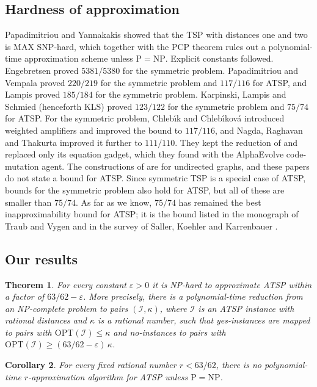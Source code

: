 \documentclass[11pt]{amsart}
\newtheorem{theorem}{Theorem}[section]
\newtheorem{corollary}[theorem]{Corollary}
\theoremstyle{definition}
\theoremstyle{remark}
\numberwithin{equation}{section}
\newcommand{\eps}{\varepsilon}
\begin{document}
\subsection*{Hardness of approximation}
Papadimitriou and Yannakakis \cite{PY93} showed that the TSP with distances one and two is MAX SNP-hard, which together with the PCP theorem \cite{ALMSS98} rules out a polynomial-time approximation scheme unless $\mathrm{P}=\mathrm{NP}$. Explicit constants followed. Engebretsen \cite{Eng03} proved $5381/5380$ for the symmetric problem. Papadimitriou and Vempala \cite{PV06} proved $220/219$ for the symmetric problem and $117/116$ for ATSP, and Lampis \cite{Lam12} proved $185/184$ for the symmetric problem. Karpinski, Lampis and Schmied \cite{KLS15} (henceforth KLS) proved $123/122$ for the symmetric problem and $75/74$ for ATSP. For the symmetric problem, Chleb\'{\i}k and Chleb\'{\i}kov\'a \cite{CC19,CC22} introduced weighted amplifiers and improved the bound to $117/116$, and Nagda, Raghavan and Thakurta \cite{NRT26} improved it further to $111/110$. They kept the reduction of \cite{CC22} and replaced only its equation gadget, which they found with the AlphaEvolve code-mutation agent. The constructions of \cite{CC22,NRT26} are for undirected graphs, and these papers do not state a bound for ATSP. Since symmetric TSP is a special case of ATSP, bounds for the symmetric problem also hold for ATSP, but all of these are smaller than $75/74$. As far as we know, $75/74$ has remained the best inapproximability bound for ATSP; it is the bound listed in the monograph of Traub and Vygen \cite[\S17.1]{TV24} and in the survey of Saller, Koehler and Karrenbauer \cite{SKK25}.

\subsection*{Our results}

\begin{theorem}\label{thm:main}
For every constant $\eps>0$ it is NP-hard to approximate ATSP within a factor of $63/62-\eps$. More precisely, there is a polynomial-time reduction from an NP-complete problem to pairs $(\mathcal{I},\kappa)$, where $\mathcal{I}$ is an ATSP instance with rational distances and $\kappa$ is a rational number, such that yes-instances are mapped to pairs with $\mathrm{OPT}(\mathcal{I})\le\kappa$ and no-instances to pairs with $\mathrm{OPT}(\mathcal{I})\ge(63/62-\eps)\,\kappa$.
\end{theorem}

\begin{corollary}\label{cor:main}
For every fixed rational number $r<63/62$, there is no polynomial-time $r$-approximation algorithm for ATSP unless $\mathrm{P}=\mathrm{NP}$.
\end{corollary}
\end{document}
